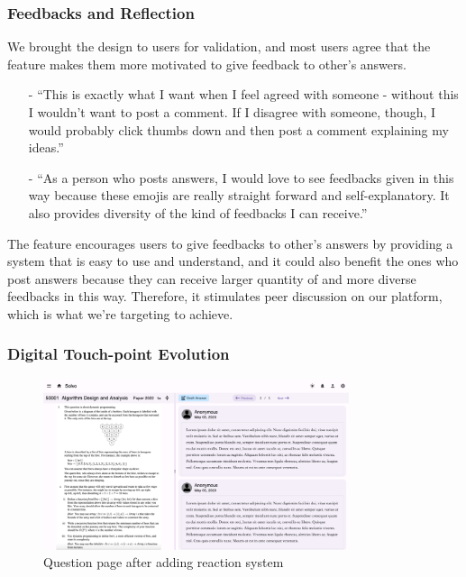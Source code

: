 \documentclass[a4paper]{article}
\begin{document}
    \subsubsection*{Feedbacks and Reflection}
    \noindent We brought the design to users for validation, and most users agree that the feature makes them more motivated to give feedback to other's answers.
    \begin{itemize}
        \item[-] ``This is exactly what I want when I feel agreed with someone - without this I wouldn't want to post a comment.
        If I disagree with someone, though, I would probably click thumbs down and then post a comment explaining my ideas.''
        \item[-] ``As a person who posts answers, I would love to see feedbacks given in this way because these emojis are really straight forward and self-explanatory.
        It also provides diversity of the kind of feedbacks I can receive.''
    \end{itemize}

    The feature encourages users to give feedbacks to other's answers by providing a system that is easy to use and understand,
    and it could also benefit the ones who post answers because they can receive larger quantity of and more diverse feedbacks in this way.
    Therefore, it stimulates peer discussion on our platform, which is what we're targeting to achieve.

    \subsubsection*{Digital Touch-point Evolution}

    \begin{figure}[H]
        \centering
        \includegraphics[width=0.8\textwidth]{question-page2}
        \\ Question page after adding reaction system
    \end{figure}
\end{document}
